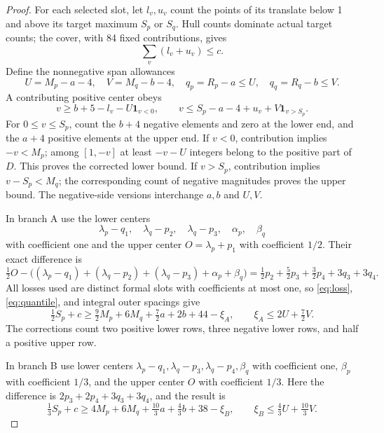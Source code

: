 \documentclass[11pt,a4paper]{article}
\begin{document}
\begin{proof}
For each selected slot, let $l_v,u_v$ count the points of its translate
below 1 and above its target maximum $S_p$ or $S_q$. Hull counts dominate
actual target counts; the cover, with 84 fixed contributions, gives
\begin{equation}\label{eq:loss}
 \sum_v(l_v+u_v)\le c.
\end{equation}
Define the nonnegative span allowances
\[
 U=M_p-a-4,\quad V=M_q-b-4,\quad q_p=R_p-a\le U,\quad q_q=R_q-b\le V.
\]
A contributing positive center obeys
\begin{equation}\label{eq:quantile}
 v\ge b+5-l_v-U\mathbf1_{v<0},\qquad
 v\le S_p-a-4+u_v+V\mathbf1_{v>S_p}.
\end{equation}
For $0\le v\le S_p$, count the $b+4$ negative elements and zero at the
lower end, and the $a+4$ positive elements at the upper end. If $v<0$,
contribution implies $-v<M_p$; among $[1,-v]$ at least $-v-U$ integers
belong to the positive part of $D$. This proves the corrected lower
bound. If $v>S_p$, contribution implies $v-S_p<M_q$; the corresponding
count of negative magnitudes proves the upper bound. The negative-side
versions interchange $a,b$ and $U,V$.

In branch A use the lower centers
\[
 \lambda_p-q_1,\quad\lambda_q-p_2,\quad\lambda_q-p_3,
 \quad\alpha_p,\quad\beta_q
\]
with coefficient one and the upper center $O=\lambda_p+p_1$ with
coefficient $1/2$. Their exact difference is
\[
 \tfrac12 O-\bigl((\lambda_p-q_1)+(\lambda_q-p_2)
 +(\lambda_q-p_3)+\alpha_p+\beta_q\bigr)
 =\tfrac12p_2+\tfrac52p_3+\tfrac32p_4+3q_3+3q_4.
\]
All losses used are distinct formal slots with coefficients at most one,
so \eqref{eq:loss}, \eqref{eq:quantile}, and integral outer spacings give
\begin{equation}\label{eq:Amid}
 \tfrac12S_p+c\ge\tfrac92M_p+6M_q+\tfrac72a+2b+44-\xi_A,
 \qquad\xi_A\le2U+\tfrac72V.
\end{equation}
The corrections count two positive lower rows, three negative lower rows,
and half a positive upper row.

In branch B use lower centers
$\lambda_p-q_1,\lambda_q-p_3,\lambda_q-p_4,\beta_q$ with coefficient
one, $\beta_p$ with coefficient $1/3$, and the upper center $O$ with
coefficient $1/3$. Here the difference is
$2p_3+2p_4+3q_3+3q_4$, and the result is
\begin{equation}\label{eq:Bmid}
 \tfrac13S_p+c\ge4M_p+6M_q+\tfrac{10}3a+\tfrac43b+38-\xi_B,
 \qquad\xi_B\le\tfrac43U+\tfrac{10}3V.
\end{equation}


\end{proof}
\end{document}
